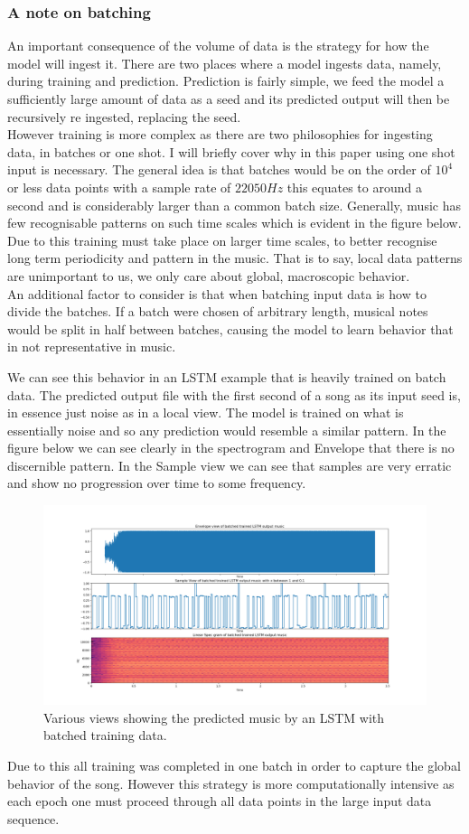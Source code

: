 \documentclass{article}
\begin{document}
\subsubsection{A note on batching}
An important consequence of the volume of data is the strategy for how the model will ingest it. 
There are two places where a model ingests data, namely, during training and prediction. Prediction is fairly simple, we feed the model a sufficiently large amount of data as a seed and its predicted output will then be recursively re ingested, replacing the seed.\\
However training is more complex as there are two philosophies for ingesting data, in batches or one shot. I will briefly cover why in this paper using one shot input is necessary. The general idea is that batches would be on the order of $10^4$ or less data points with a sample rate of $22050 Hz$ this equates to around a second and is considerably larger than a common batch size. Generally, music has few recognisable patterns on such time scales which is evident in the figure below. Due to this training must take place on larger time scales, to better recognise long term periodicity and pattern in the music. That is to say, local data patterns are unimportant to us, we only care about global, macroscopic behavior.\\
An additional factor to consider is that when batching input data is how to divide the batches. If a batch were chosen of arbitrary length, musical notes would be split in half between batches, causing the model to learn behavior that in not representative in music. 


We can see this behavior in an LSTM example that is heavily trained on batch data. The predicted output file with the first second of a song as its input seed is, in essence just noise as in a local view. The model is trained on what is essentially noise and so any prediction would resemble a similar pattern. In the figure below we can see clearly in the spectrogram and Envelope that there is no discernible pattern. In the Sample view we can see that samples are very erratic and show no progression over time to some frequency. 
\begin{figure}[H]
\caption{Various views showing the predicted music by an LSTM with batched training data. }
\includegraphics[scale=0.35]{batch_training.png}
\end{figure}
Due to this all training was completed in one batch in order to capture the global behavior of the song. However this strategy is more computationally intensive as each epoch one must proceed through all data points in the large input data sequence. 
\end{document}

